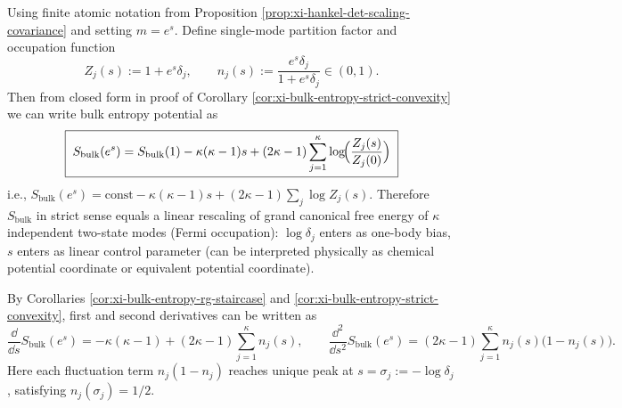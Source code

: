
\begin{remark}\label{rem:xi-bulk-entropy-fermi-grand-canonical}
Using finite atomic notation from Proposition \ref{prop:xi-hankel-det-scaling-covariance} and setting \(m=e^s\).
Define single-mode partition factor and occupation function
\[
Z_j(s):=1+e^{s}\delta_j,
\qquad
n_j(s):=\frac{e^{s}\delta_j}{1+e^{s}\delta_j}\in(0,1).
\]
Then from closed form in proof of Corollary \ref{cor:xi-bulk-entropy-strict-convexity} we can write bulk entropy potential as
\[
\boxed{\;
S_{\mathrm{bulk}}(e^{s})
=S_{\mathrm{bulk}}(1)-\kappa(\kappa-1)s
+(2\kappa-1)\sum_{j=1}^{\kappa}\log\!\Bigl(\frac{Z_j(s)}{Z_j(0)}\Bigr)\;}
\]
i.e.,
\(
S_{\mathrm{bulk}}(e^{s})=\mathrm{const}-\kappa(\kappa-1)s+(2\kappa-1)\sum_j\log Z_j(s)
\).
Therefore \(S_{\mathrm{bulk}}\) in strict sense equals a linear rescaling of grand canonical free energy of \(\kappa\) independent two-state modes (Fermi occupation): \(\log\delta_j\) enters as one-body bias, \(s\) enters as linear control parameter (can be interpreted physically as chemical potential coordinate or equivalent potential coordinate).
\par
By Corollaries \ref{cor:xi-bulk-entropy-rg-staircase} and \ref{cor:xi-bulk-entropy-strict-convexity}, first and second derivatives can be written as
\[
\frac{\dd}{\dd s}S_{\mathrm{bulk}}(e^s)=-\kappa(\kappa-1)+(2\kappa-1)\sum_{j=1}^{\kappa}n_j(s),
\qquad
\frac{\dd^2}{\dd s^2}S_{\mathrm{bulk}}(e^s)=(2\kappa-1)\sum_{j=1}^{\kappa}n_j(s)\bigl(1-n_j(s)\bigr).
\]
Here each fluctuation term \(n_j(1-n_j)\) reaches unique peak at \(s=\sigma_j:=-\log\delta_j\), satisfying \(n_j(\sigma_j)=1/2\).
\end{remark}

